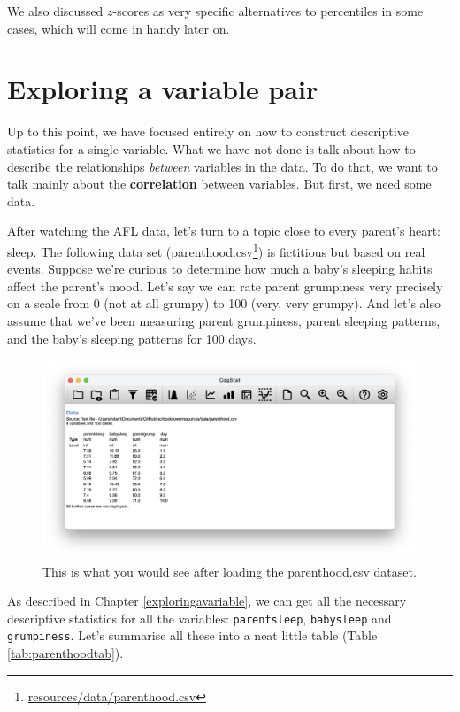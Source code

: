 \documentclass[
  11pt,
  a4paper,
  twoside,symmetric,openright]{book}
\theoremstyle{break}
\theoremstyle{break}
\DeclareRobustCommand{\href}[2]{#2\footnote{\url{#1}}}
\begin{document}
We also discussed \(z\)-scores as very specific alternatives to percentiles in some cases, which will come in handy later on.

\hypertarget{correl}{%
\chapter{Exploring a variable pair}\label{correl}}

Up to this point, we have focused entirely on how to construct descriptive statistics for a single variable. What we have not done is talk about how to describe the relationships \emph{between} variables in the data. To do that, we want to talk mainly about the \textbf{correlation} between variables. But first, we need some data.

After watching the AFL data, let's turn to a topic close to every parent's heart: sleep. The following data set (\href{resources/data/parenthood.csv}{parenthood.csv}) is fictitious but based on real events. Suppose we're curious to determine how much a baby's sleeping habits affect the parent's mood. Let's say we can rate parent grumpiness very precisely on a scale from 0 (not at all grumpy) to 100 (very, very grumpy). And let's also assume that we've been measuring parent grumpiness, parent sleeping patterns, and the baby's sleeping patterns for 100 days.

\begin{figure}

{\centering \includegraphics[width=0.6\linewidth]{resources/image/cogstatparenthoodload} 

}

\caption{This is what you would see after loading the parenthood.csv dataset.}\label{fig:loadparenthood}
\end{figure}

As described in Chapter \ref{exploringavariable}, we can get all the necessary descriptive statistics for all the variables: \texttt{parentsleep}, \texttt{babysleep} and \texttt{grumpiness}. Let's summarise all these into a neat little table (Table \ref{tab:parenthoodtab}).
\end{document}
